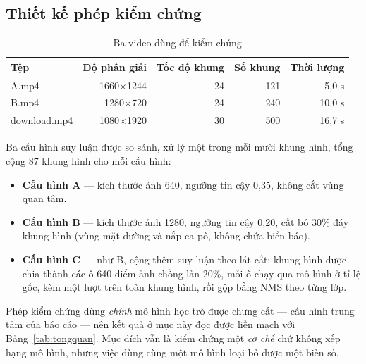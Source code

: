 \subsection{Thiết kế phép kiểm chứng}

\begin{table}[H]
\centering
\caption{Ba video dùng để kiểm chứng}
\label{tab:video_meta}
\small
\begin{tabular}{lrrrr}
\toprule
\textbf{Tệp} & \textbf{Độ phân giải} & \textbf{Tốc độ khung} & \textbf{Số khung} & \textbf{Thời lượng} \\
\midrule
A.mp4        & 1660$\times$1244 & 24 & 121 & 5,0 s \\
B.mp4        & 1280$\times$720  & 24 & 240 & 10,0 s \\
download.mp4 & 1080$\times$1920 & 30 & 500 & 16,7 s \\
\bottomrule
\end{tabular}
\end{table}


Ba cấu hình suy luận được so sánh, xử lý một trong mỗi mười khung hình, tổng cộng 87 khung hình cho
mỗi cấu hình:

\begin{itemize}[leftmargin=1.5cm]
\item \textbf{Cấu hình A} --- kích thước ảnh 640, ngưỡng tin cậy 0,35, không cắt vùng quan tâm.
\item \textbf{Cấu hình B} --- kích thước ảnh 1280, ngưỡng tin cậy 0,20, cắt bỏ 30\% đáy khung hình
(vùng mặt đường và nắp ca-pô, không chứa biển báo).
\item \textbf{Cấu hình C} --- như B, cộng thêm suy luận theo lát cắt: khung hình được chia thành các
ô 640 điểm ảnh chồng lấn 20\%, mỗi ô chạy qua mô hình ở tỉ lệ gốc, kèm một lượt trên toàn khung
hình, rồi gộp bằng NMS theo từng lớp.
\end{itemize}

Phép kiểm chứng dùng \emph{chính} mô hình học trò được chưng cất --- cấu hình trung tâm của báo
cáo --- nên kết quả ở mục này đọc được liền mạch với Bảng~\ref{tab:tongquan}. Mục đích vẫn là kiểm
chứng một \emph{cơ chế} chứ không xếp hạng mô hình, nhưng việc dùng cùng một mô hình loại bỏ được
một biến số.

